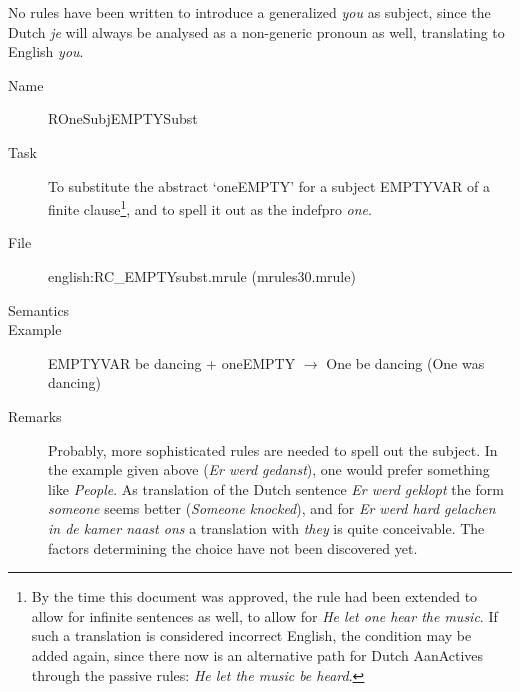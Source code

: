 \begin{description}
\begin{description}
No rules have been written to introduce a generalized {\em you\/} as subject, 
since the Dutch {\em je\/} will always be analysed as a non-generic pronoun as 
well, translating to English {\em you\/}.
\end{description}

\vspace{1 cm}
\begin{description}
\item[Name]   ROneSubjEMPTYSubst
\item[Task] To substitute the abstract `oneEMPTY' for a subject EMPTYVAR of a 
finite clause\footnote{By the time this document was approved, the rule had 
been extended to allow for infinite sentences as well, to allow for 
{\em He let one hear the music\/}. If such a translation is 
considered incorrect English, the condition may be added again, since there now 
is an alternative path for Dutch AanActives through the passive rules: 
{\em He let the music be 
heard\/}.}, and to spell it out as the indefpro {\em one\/}.
\item[File] english:RC\_EMPTYsubst.mrule (mrules30.mrule)
\item[Semantics]
\item[Example] EMPTYVAR be dancing + oneEMPTY $\rightarrow$ One be dancing 
(One was dancing)
\item[Remarks] Probably, more sophisticated rules are needed to spell out the 
subject. In the example given above ({\em Er werd gedanst\/}), 
one would prefer something like 
{\em People\/}. As translation of the Dutch sentence {\em Er werd ge\-klopt\/} 
the form {\em someone\/} seems better ({\em Someone knocked\/}), and for 
{\em Er werd hard gelachen in de kamer naast ons\/} a translation with {\em 
they\/} is quite conceivable. The factors determining the choice have not 
been discovered yet.
\end{description}


\end{description}
